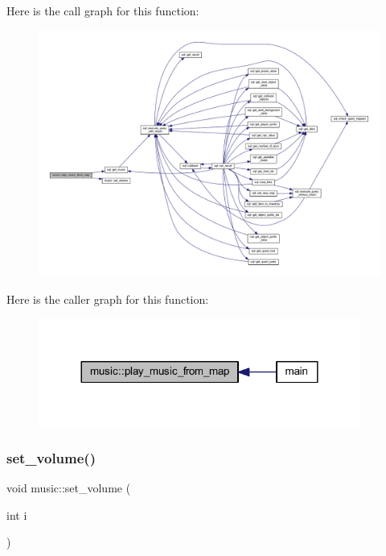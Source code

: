 Here is the call graph for this function\+:
\nopagebreak
\begin{figure}[H]
\begin{center}
\leavevmode
\includegraphics[width=350pt]{classmusic_ae7835578f75b785e1ef2a3d0db9420b9_cgraph}
\end{center}
\end{figure}
Here is the caller graph for this function\+:
\nopagebreak
\begin{figure}[H]
\begin{center}
\leavevmode
\includegraphics[width=300pt]{classmusic_ae7835578f75b785e1ef2a3d0db9420b9_icgraph}
\end{center}
\end{figure}
\mbox{\label{classmusic_aeb639e45c64ee79496e8ec6187cfcf70}} 
\subsubsection{\texorpdfstring{set\+\_\+volume()}{set\_volume()}}
{\footnotesize\ttfamily void music\+::set\+\_\+volume (\begin{DoxyParamCaption}\item[{int}]{i }\end{DoxyParamCaption})}




